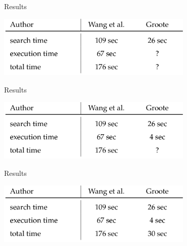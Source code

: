 \begin{frame}[fragile]{Results} 
\begin{center}
 \includegraphics[width=0.7\textwidth]{figures/results/wang_groote_2}
\end{center}
\end{frame}
\begin{frame}[fragile]{Results} 
\begin{center}
 \includegraphics[width=0.7\textwidth]{figures/results/wang_groote_3}
\end{center}
\end{frame}
\begin{frame}[fragile]{Results} 
\begin{center}
 \includegraphics[width=0.7\textwidth]{figures/results/wang_groote_4}
\end{center}
\end{frame}

